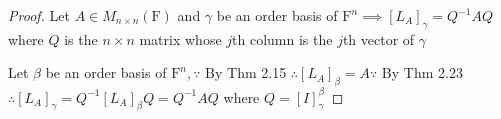 \begin{proof}
	Let $A \in M_{n \times n}(\mathrm{F})$ and $\gamma$ be an order basis of $\mathrm{F}^n \implies [L_A]_{\gamma} = Q^{-1}AQ$ where $Q$ is the $n \times n$ matrix whose $j$th column is the $j$th vector of $\gamma$
	
	Let $\beta$ be an order basis of $\mathrm{F}^n, \because$ By Thm 2.15 $\therefore [L_A]_{\beta}= A \because$ By Thm 2.23 $\therefore [L_A]_{\gamma} = Q^{-1}[L_A]_{\beta}Q = Q^{-1}AQ$ where $Q = [I]^{\beta}_{\gamma}$

\end{proof}